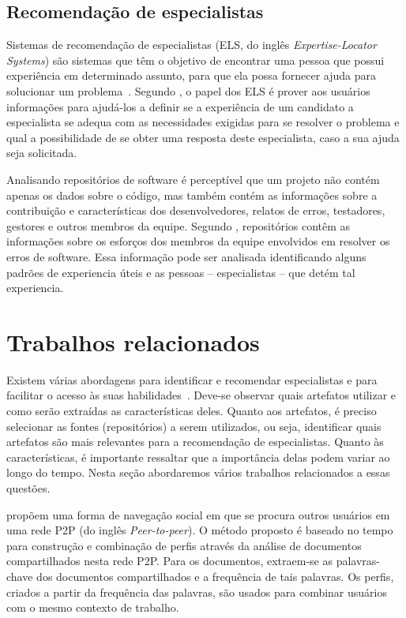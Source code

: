 \documentclass[oneside,brazil,a4paper]{normas-utf-tex}
\begin{document}
\subsection{Recomendação de especialistas}

Sistemas de recomendação de especialistas (ELS, do inglês \textit{Expertise-Locator Systems}) são sistemas que têm o objetivo de encontrar uma pessoa que possui experiência em determinado assunto, para que ela possa fornecer ajuda para solucionar um problema~\cite{Becerra-Fernandez-etal:2006}. Segundo , o papel dos ELS é prover aos usuários informações para ajudá-los a definir se a experiência de um candidato a especialista se adequa com as necessidades exigidas para se resolver o problema e qual a possibilidade de se obter uma resposta deste especialista, caso a sua ajuda seja solicitada.

Analisando repositórios de software é perceptível que um projeto não contém apenas os dados sobre o código, mas também contém as informações sobre a contribuição e características dos desenvolvedores, relatos de erros, testadores, gestores e outros membros da equipe. Segundo , repositórios contêm as informações sobre os esforços dos membros da equipe envolvidos em resolver os erros de software. Essa informação pode ser analisada identificando alguns padrões de experiencia úteis e as pessoas -- especialistas -- que detém tal experiencia. 



\section{Trabalhos relacionados}
\label{sect:trabalhos}

Existem várias abordagens para identificar e recomendar especialistas e para facilitar o acesso às suas habilidades~\cite{Mockus-etal:2002}. Deve-se observar quais artefatos utilizar e como serão extraídas as características deles. Quanto aos artefatos, é preciso selecionar as fontes (repositórios) a serem utilizados, ou seja, identificar quais artefatos são mais relevantes para a recomendação de especialistas. Quanto às características, é importante ressaltar que a importância delas podem variar ao longo do tempo. Nesta seção abordaremos vários trabalhos relacionados a essas questões.

 propõem uma forma de navegação social em que se procura outros usuários em uma rede P2P (do inglês \textit{Peer-to-peer}). O método proposto é baseado no tempo para construção e combinação de perfis através da análise de documentos compartilhados nesta rede P2P. Para os documentos, extraem-se as palavras-chave dos documentos compartilhados e a frequência de tais palavras. Os perfis, criados a partir da frequência das palavras, são usados para combinar usuários com o mesmo contexto de trabalho.
\end{document}
